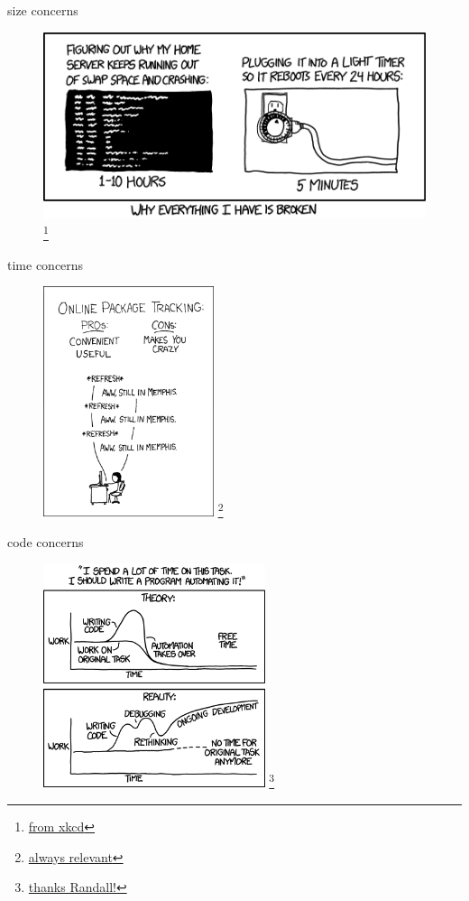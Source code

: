 \documentclass{beamer}
\begin{document}
\begin{frame}{size concerns}
    \begin{figure}
        \centering
        \includegraphics[width=\textwidth]{hard_reboot.png}
        \footnote{\href{http://xkcd.com}{from xkcd}}
    \end{figure}
\end{frame}

\begin{frame}{time concerns}
    \begin{figure}
        \centering
        \includegraphics[width=5cm]{online_package_tracking.png}
        \footnote{\href{http://xkcd.com}{always relevant}}
    \end{figure}
\end{frame}

\begin{frame}{code concerns}
    \begin{figure}
        \centering
        \includegraphics[width=6.5cm]{automation.png}
        \footnote{\href{http://xkcd.com}{thanks Randall!}}
    \end{figure}
\end{frame}
\end{document}
